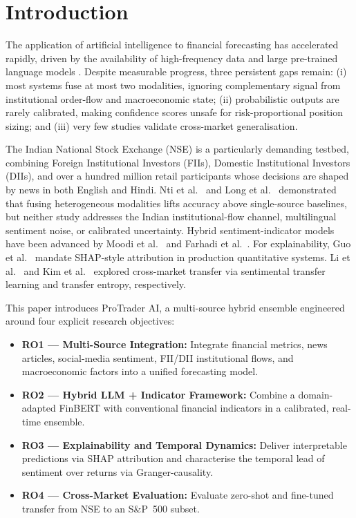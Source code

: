 \documentclass[12pt,a4paper]{article}
\begin{document}
\section{Introduction}

The application of artificial intelligence to financial forecasting has
accelerated rapidly, driven by the availability of high-frequency data and
large pre-trained language models \cite{r1}. Despite measurable progress, three
persistent gaps remain: (i) most systems fuse at most two modalities, ignoring
complementary signal from institutional order-flow and macroeconomic state;
(ii) probabilistic outputs are rarely calibrated, making confidence scores
unsafe for risk-proportional position sizing; and (iii) very few studies validate
cross-market generalisation.

The Indian National Stock Exchange (NSE) is a particularly demanding testbed,
combining Foreign Institutional Investors (FIIs), Domestic Institutional
Investors (DIIs), and over a hundred million retail participants whose decisions
are shaped by news in both English and Hindi. Nti et al.\ \cite{r2} and Long
et al.\ \cite{r3} demonstrated that fusing heterogeneous modalities lifts
accuracy above single-source baselines, but neither study addresses the Indian
institutional-flow channel, multilingual sentiment noise, or calibrated
uncertainty. Hybrid sentiment-indicator models have been advanced by Moodi et al.\
\cite{r5} and Farhadi et al.\ \cite{r6}. For explainability, Guo et al.\
\cite{r9} mandate SHAP-style attribution in production quantitative systems.
Li et al.\ \cite{r10} and Kim et al.\ \cite{r11} explored cross-market transfer
via sentimental transfer learning and transfer entropy, respectively.

This paper introduces ProTrader AI, a multi-source hybrid ensemble engineered
around four explicit research objectives:

\begin{itemize}
  \item \textbf{RO1 --- Multi-Source Integration:} Integrate financial metrics,
        news articles, social-media sentiment, FII/DII institutional flows, and
        macroeconomic factors into a unified forecasting model.
  \item \textbf{RO2 --- Hybrid LLM + Indicator Framework:} Combine a domain-adapted
        FinBERT with conventional financial indicators in a calibrated, real-time
        ensemble.
  \item \textbf{RO3 --- Explainability and Temporal Dynamics:} Deliver interpretable
        predictions via SHAP attribution and characterise the temporal lead of
        sentiment over returns via Granger-causality.
  \item \textbf{RO4 --- Cross-Market Evaluation:} Evaluate zero-shot and fine-tuned
        transfer from NSE to an S\&P~500 subset.
\end{itemize}
\end{document}
